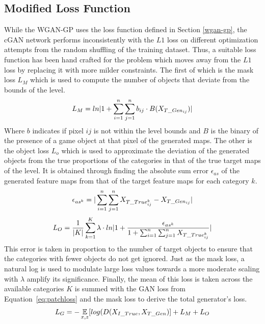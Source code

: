 \documentclass{Configuration_Files/PoliMi3i_thesis}
\begin{document}
\subsection{Modified Loss Function}
While the WGAN-GP uses the loss function defined in Section \ref{wgan-gp}, the cGAN network 
performs inconsistently with the $L1$ loss on different optimization attempts from the random 
shuffling of the training dataset. Thus, a suitable loss function has been hand crafted for the 
problem which moves away from the $L1$ loss by replacing it with more milder constraints. 
The first of which is the mask loss $L_{M}$ which is used to compute the number of objects 
that deviate from the bounds of the level. 
\begin{equation} \label{eq:maskloss}
L_{M} = ln|1+\sum_{i=1}^n \sum_{j=1}^n b_{ij} \cdot B(X_{T\char`_Gen_{ij}})|
\end{equation}
Where $b$ indicates if pixel $ij$ is not within the level bounds and $B$ is the binary of the 
presence of a game object at that pixel of the generated maps. The other 
is the object loss $L_{o}$ which is used to approximate the deviation  of the generated objects from 
the true proportions of the categories in that of the true target maps of the level. It is obtained 
through finding the absolute sum error $\epsilon_{as}$ of the generated feature maps from 
that of the target feature maps for each category $k$.
\begin{equation} \label{eq:ase}
\epsilon_{as^k} = |\sum_{i=1}^n \sum_{j=1}^n X_{T\char`_True_{ij}^k} - X_{T\char`_Gen_{ij}}|
\end{equation}
\begin{equation} \label{eq:objectloss}
L_{O} = \dfrac{1}{|K|}\sum_{k=1}^K\lambda \cdot ln|1+ \dfrac{\epsilon_{as^k}}{1+ \sum_{i=1}^n \sum_{j=1}^nX_{T\char`_True_{ij}^k}}|
\end{equation}
This error is taken in proportion to the number of target objects to ensure that the categories 
with fewer objects do not get ignored. Just as the mask loss, a natural log is used to modulate  
large loss values towards a more moderate scaling with $\lambda$ amplify its significance. 
Finally, the mean of this loss is taken across the available categories $K$ is summed with 
the GAN loss from Equation~\ref{eq:patchloss} and the mask loss to derive the total generator’s loss.
\begin{equation} \label{eq:genloss}
L_{G}=-\mathop{{}\mathbb{E}}_{x,z}[log(D(X_{I\char`_True},X_{T\char`_Gen})] + L_{M} + L_{O}
\end{equation}
\end{document}
